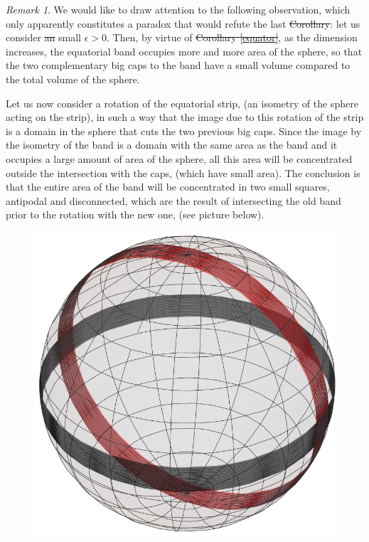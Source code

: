 \documentclass{amsart}
\theoremstyle{definition}
\theoremstyle{remark}
\newtheorem{remark}[theorem]{Remark}
\providecommand{\DIFadd}[1]{{\protect\color{blue}\uwave{#1}}} %
\providecommand{\DIFdel}[1]{{\protect\color{red}\sout{#1}}}                      %
\providecommand{\DIFaddbegin}{} %
\providecommand{\DIFaddend}{} %
\providecommand{\DIFdelbegin}{} %
\providecommand{\DIFdelend}{} %
\begin{document}
\DIFaddend \begin{remark}
 We would like to draw attention to the following observation, which only apparently constitutes a paradox that would refute the last \DIFdelbegin \DIFdel{Corollary}\DIFdelend \DIFaddbegin \DIFadd{property}\DIFaddend : let us consider  \DIFdelbegin \DIFdel{an }\DIFdelend small $\epsilon >0$. Then, by virtue of \DIFdelbegin \DIFdel{Corollary \ref{equator}}\DIFdelend \DIFaddbegin \DIFadd{the limit \eqref{eq3.1}}\DIFaddend , as the dimension increases, the equatorial band occupies more and more area of the sphere, so that the two complementary big caps to the band have a small volume compared to the total volume of the sphere. 

 Let us now consider a rotation of the equatorial strip, (an isometry of the sphere acting on the strip), in such a way that the image due to this rotation of the strip is a domain in the sphere that cuts the two previous big caps. Since the image by the isometry of the band is a domain with the same area as the band and it occupies a large amount of area of the sphere, all this area will be concentrated outside the intersection with the caps, (which have small area). 
  The conclusion is that the entire area of the band will be concentrated in two small squares, antipodal and disconnected, which are the result of intersecting the old band prior to the rotation with the new one, (see picture below).
 \begin{figure}
     \centering
     \includegraphics[scale=0.3]{dosbandes}

\end{figure}
\end{remark}
\end{document}

